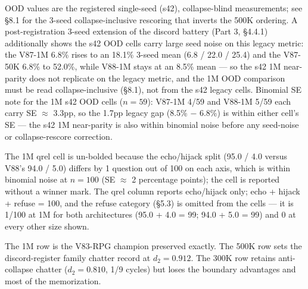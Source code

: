 \documentclass[11pt]{article}
\begin{document}
\textdagger{} OOD values are the registered single-seed (s42), collapse-blind measurements; see \S8.1 for the 3-seed collapse-inclusive rescoring that inverts the 500K ordering. A post-registration 3-seed extension of the discord battery (Part 3, \S4.4.1) additionally shows the s42 OOD cells carry large seed noise on this legacy metric: the V87-1M 6.8\% rises to an 18.1\% 3-seed mean (6.8 / 22.0 / 25.4) and the V87-50K 6.8\% to 52.0\%, while V88-1M stays at an 8.5\% mean --- so the s42 1M near-parity does not replicate on the legacy metric, and the 1M OOD comparison must be read collapse-inclusive (\S8.1), not from the s42 legacy cells. Binomial SE note for the 1M s42 OOD cells ($n=59$): V87-1M 4/59 and V88-1M 5/59 each carry SE $\approx$ 3.3pp, so the 1.7pp legacy gap (8.5\% $-$ 6.8\%) is within either cell's SE --- the s42 1M near-parity is also within binomial noise before any seed-noise or collapse-rescore correction.

\textsection{} The 1M qrel cell is un-bolded because the echo/hijack split (95.0 / 4.0 versus V88's 94.0 / 5.0) differs by 1 question out of 100 on each axis, which is within binomial noise at $n=100$ (SE $\approx$ 2 percentage points); the cell is reported without a winner mark. The qrel column reports echo/hijack only; echo + hijack + refuse = 100, and the refuse category (\S5.3) is omitted from the cells --- it is 1/100 at 1M for both architectures (95.0 + 4.0 = 99; 94.0 + 5.0 = 99) and 0 at every other size shown.

The 1M row is the V83-RPG champion preserved exactly. The 500K row sets the discord-register family chatter record at $d_2 = 0.912$. The 300K row retains anti-collapse chatter ($d_2 = 0.810$, 1/9 cycles) but loses the boundary advantages and most of the memorization.
\end{document}
